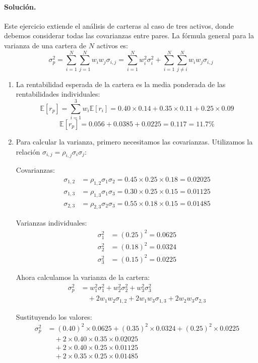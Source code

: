 \documentclass[12pt,a4paper]{article}
\newcommand{\E}{\mathbb{E}}
\newenvironment{solucion}{\paragraph{Solución.}}{}
\begin{document}
\begin{solucion}
Este ejercicio extiende el análisis de carteras al caso de tres activos, donde debemos considerar todas las covarianzas entre pares. La fórmula general para la varianza de una cartera de $N$ activos es:
\[
\sigma_p^2 = \sum_{i=1}^{N} \sum_{j=1}^{N} w_i w_j \sigma_{i,j} = \sum_{i=1}^{N} w_i^2 \sigma_i^2 + \sum_{i=1}^{N} \sum_{j \neq i}^{N} w_i w_j \sigma_{i,j}
\]

\begin{enumerate}[label=\alph*)]
  \item La rentabilidad esperada de la cartera es la media ponderada de las rentabilidades individuales:
  \[
  \E[r_p] = \sum_{i=1}^{3} w_i \E[r_i] = 0.40 \times 0.14 + 0.35 \times 0.11 + 0.25 \times 0.09
  \]
  \[
  \E[r_p] = 0.056 + 0.0385 + 0.0225 = 0.117 = 11.7\%
  \]

  \item Para calcular la varianza, primero necesitamos las covarianzas. Utilizamos la relación $\sigma_{i,j} = \rho_{i,j} \sigma_i \sigma_j$:

  Covarianzas:
  \begin{align*}
  \sigma_{1,2} &= \rho_{1,2} \sigma_1 \sigma_2 = 0.45 \times 0.25 \times 0.18 = 0.02025 \\
  \sigma_{1,3} &= \rho_{1,3} \sigma_1 \sigma_3 = 0.30 \times 0.25 \times 0.15 = 0.01125 \\
  \sigma_{2,3} &= \rho_{2,3} \sigma_2 \sigma_3 = 0.55 \times 0.18 \times 0.15 = 0.01485
  \end{align*}

  Varianzas individuales:
  \begin{align*}
  \sigma_1^2 &= (0.25)^2 = 0.0625 \\
  \sigma_2^2 &= (0.18)^2 = 0.0324 \\
  \sigma_3^2 &= (0.15)^2 = 0.0225
  \end{align*}

  Ahora calculamos la varianza de la cartera:
  \begin{align*}
  \sigma_p^2 &= w_1^2 \sigma_1^2 + w_2^2 \sigma_2^2 + w_3^2 \sigma_3^2 \\
  &\quad + 2w_1 w_2 \sigma_{1,2} + 2w_1 w_3 \sigma_{1,3} + 2w_2 w_3 \sigma_{2,3}
  \end{align*}

  Sustituyendo los valores:
  \begin{align*}
  \sigma_p^2 &= (0.40)^2 \times 0.0625 + (0.35)^2 \times 0.0324 + (0.25)^2 \times 0.0225 \\
  &\quad + 2 \times 0.40 \times 0.35 \times 0.02025 \\
  &\quad + 2 \times 0.40 \times 0.25 \times 0.01125 \\
  &\quad + 2 \times 0.35 \times 0.25 \times 0.01485
  \end{align*}


\end{enumerate}
\end{solucion}
\end{document}
